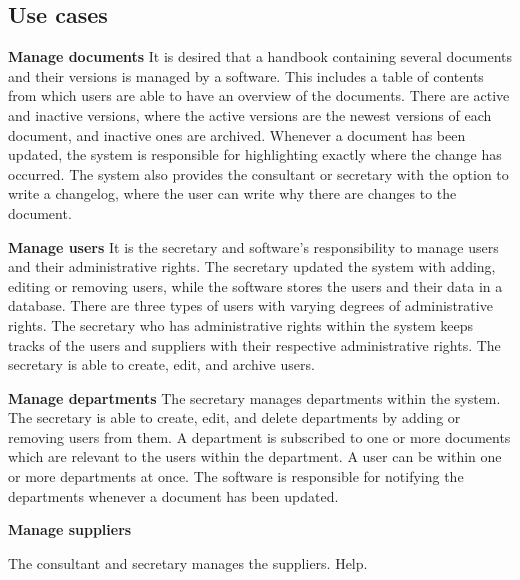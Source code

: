 \subsection{Use cases}
\textbf{Manage documents}
It is desired that a handbook containing several documents and their versions is managed by a software. This includes a table of contents from which users are able to have an overview of the documents. There are active and inactive versions, where the active versions are the newest versions of each document, and inactive ones are archived. Whenever a document has been updated, the system is responsible for highlighting exactly where the change has occurred. The system also provides the consultant or secretary with the option to write a changelog, where the user can write why there are changes to the document.

\textbf{Manage users}
It is the secretary and software's responsibility to manage users and their administrative rights.
The secretary updated the system with adding, editing or removing users, while the software stores the users and their data in a database.
There are three types of users with varying degrees of administrative rights.
The secretary who has administrative rights within the system keeps tracks of the users and suppliers with their respective administrative rights.
The secretary is able to create, edit, and archive users.

\textbf{Manage departments}
The secretary manages departments within the system.
The secretary is able to create, edit, and delete departments by adding or removing users from them.
A department is subscribed to one or more documents which are relevant to the users within the department.
A user can be within one or more departments at once.
The software is responsible for notifying the departments whenever a document has been updated.

\textbf{Manage suppliers}

The consultant and secretary manages the suppliers. Help.

